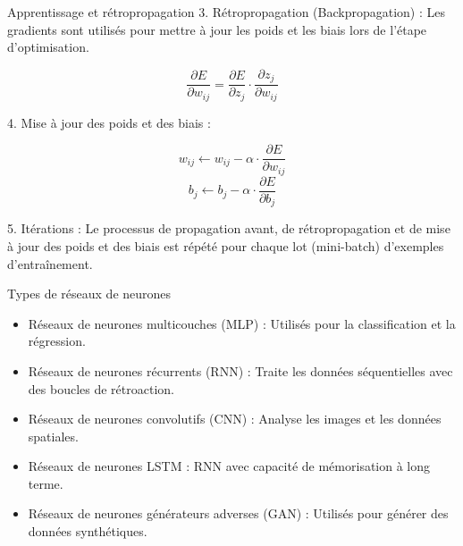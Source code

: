 \documentclass{beamer}
\begin{document}
\begin{frame}{Apprentissage et rétropropagation}
	3. Rétropropagation (Backpropagation) :
	Les gradients sont utilisés pour mettre à jour les poids et les biais lors de l'étape d'optimisation.
	
	\[\frac{\partial E}{\partial w_{ij}} = \frac{\partial E}{\partial z_j} \cdot \frac{\partial z_j}{\partial w_{ij}}\]
	
	4. Mise à jour des poids et des biais :
	
	\[w_{ij} \leftarrow w_{ij} - \alpha \cdot \frac{\partial E}{\partial w_{ij}}\]
	\[b_j \leftarrow b_j - \alpha \cdot \frac{\partial E}{\partial b_j}\]
	
	
	5. Itérations :
	Le processus de propagation avant, de rétropropagation et de mise à jour des poids et des biais est répété pour chaque lot (mini-batch) d'exemples d'entraînement.
\end{frame}

\begin{frame}{Types de réseaux de neurones  }
	\begin{itemize}
		\item Réseaux de neurones multicouches (MLP) : Utilisés pour la classification et la régression.
		\item Réseaux de neurones récurrents (RNN) : Traite les données séquentielles avec des boucles de rétroaction.
		\item Réseaux de neurones convolutifs (CNN) : Analyse les images et les données spatiales.
		\item Réseaux de neurones LSTM : RNN avec capacité de mémorisation à long terme.
		\item Réseaux de neurones générateurs adverses (GAN) : Utilisés pour générer des données synthétiques.
	\end{itemize}
\end{frame}
\end{document}
